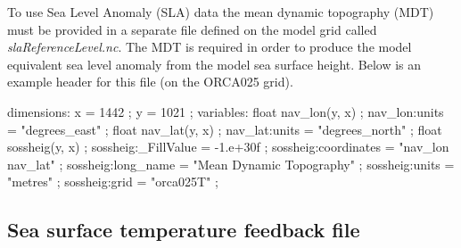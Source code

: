 \documentclass[../main/NEMO_manual]{subfiles}
\begin{document}
To use Sea Level Anomaly (SLA) data the mean dynamic topography (MDT) must be provided in a separate file defined on
the model grid called \textit{slaReferenceLevel.nc}.
The MDT is required in order to produce the model equivalent sea level anomaly from the model sea surface height.
Below is an example header for this file (on the ORCA025 grid).

\begin{clines}
dimensions:
        x = 1442 ;
        y = 1021 ;
variables:
        float nav_lon(y, x) ;
                nav_lon:units = "degrees_east" ;
        float nav_lat(y, x) ;
                nav_lat:units = "degrees_north" ;
        float sossheig(y, x) ;
                sossheig:_FillValue = -1.e+30f ;
                sossheig:coordinates = "nav_lon nav_lat" ;
                sossheig:long_name = "Mean Dynamic Topography" ;
                sossheig:units = "metres" ;
                sossheig:grid = "orca025T" ;
\end{clines}

\subsection{Sea surface temperature feedback file}
\end{document}
